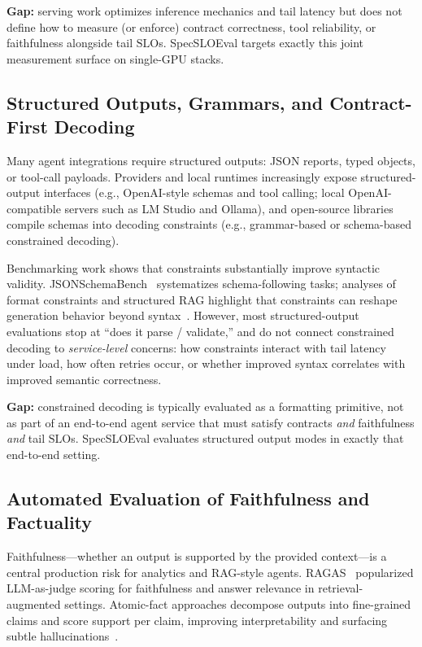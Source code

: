 \documentclass[11pt]{article}
\newcommand{\slo}{\ensuremath{\mathrm{SLO}}}
\begin{document}
\textbf{Gap:} serving work optimizes inference mechanics and tail latency but does not define how to measure (or enforce) contract correctness, tool reliability, or faithfulness alongside tail \slo s.
SpecSLOEval targets exactly this joint measurement surface on single-GPU stacks.

\subsection{Structured Outputs, Grammars, and Contract-First Decoding}

Many agent integrations require structured outputs: JSON reports, typed objects, or tool-call payloads.
Providers and local runtimes increasingly expose structured-output interfaces (e.g., OpenAI-style schemas and tool calling; local OpenAI-compatible servers such as LM Studio and Ollama), and open-source libraries compile schemas into decoding constraints (e.g., grammar-based or schema-based constrained decoding).

Benchmarking work shows that constraints substantially improve syntactic validity.
JSONSchemaBench~\citep{geng2025jsonschemabench} systematizes schema-following tasks; analyses of format constraints and structured RAG highlight that constraints can reshape generation behavior beyond syntax~\citep{letmespeakfreely,structuredRAG}.
However, most structured-output evaluations stop at “does it parse / validate,” and do not connect constrained decoding to \emph{service-level} concerns: how constraints interact with tail latency under load, how often retries occur, or whether improved syntax correlates with improved semantic correctness.

\textbf{Gap:} constrained decoding is typically evaluated as a formatting primitive, not as part of an end-to-end agent service that must satisfy contracts \emph{and} faithfulness \emph{and} tail \slo s.
SpecSLOEval evaluates structured output modes in exactly that end-to-end setting.

\subsection{Automated Evaluation of Faithfulness and Factuality}

Faithfulness---whether an output is supported by the provided context---is a central production risk for analytics and RAG-style agents.
RAGAS~\citep{es2023ragas} popularized LLM-as-judge scoring for faithfulness and answer relevance in retrieval-augmented settings.
Atomic-fact approaches decompose outputs into fine-grained claims and score support per claim, improving interpretability and surfacing subtle hallucinations~\citep{atomicFacts2024}.
\end{document}
